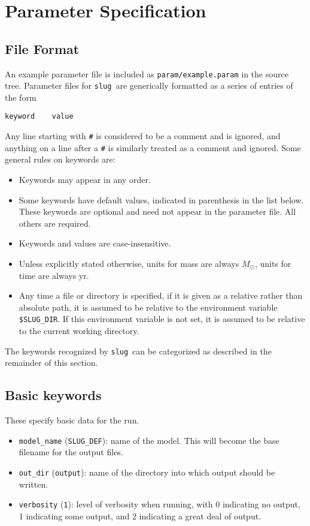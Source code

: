\documentclass[12pt]{article}
\newcommand{\slug}{\texttt{slug}}
\begin{document}
\section{Parameter Specification}
\label{sec:parameters}

\subsection{File Format}

An example parameter file is included as \verb=param/example.param= in the source tree. Parameter files for \slug\ are generically formatted as a series of entries of the form
\begin{verbatim}
keyword    value
\end{verbatim}
Any line starting with \verb=#= is considered to be a comment and is ignored, and anything on a line after a \verb=#= is similarly treated as a comment and ignored. Some general rules on keywords are:
\begin{itemize}
\item Keywords may appear in any order.
\item Some keywords have default values, indicated in parenthesis in the list below. These keywords are optional and need not appear in the parameter file. All others are required. 
\item Keywords and values are case-insensitive. 
\item Unless explicitly stated otherwise, units for mass are always $M_\odot$, units for time are always yr.
\item Any time a file or directory is specified, if it is given as a relative rather than absolute path, it is assumed to be relative to the environment variable \verb=$SLUG_DIR=. If this environment variable is not set, it is assumed to be relative to the current working directory.
\end{itemize}

The keywords recognized by \slug\ can be categorized as described in the remainder of this section.

\subsection{Basic keywords}

These specify basic data for the run.
\begin{itemize}
\item \verb=model_name= (\verb=SLUG_DEF=): name of the model. This will become the base filename for the output files.
\item \verb=out_dir= (\verb=output=): name of the directory into which output should be written.
\item \verb=verbosity= (\verb=1=): level of verbosity when running, with 0 indicating no output, 1 indicating some output, and 2 indicating a great deal of output.
\end{itemize}
\end{document}
